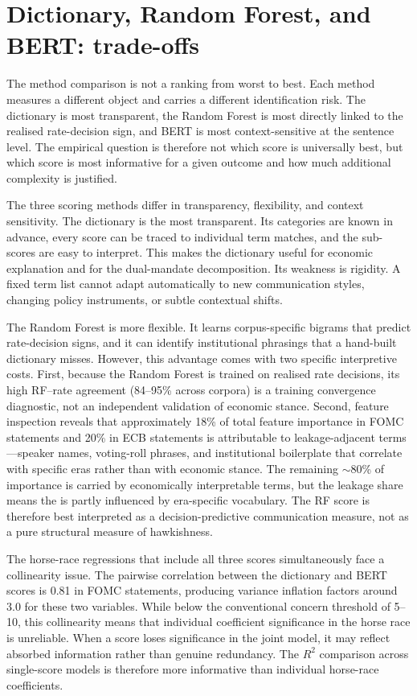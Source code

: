 \section{Dictionary, Random Forest, and BERT: trade-offs}
\label{sec:disc_method_tradeoffs}

The method comparison is not a ranking from worst to best. Each method measures
a different object and carries a different identification risk. The dictionary is
most transparent, the Random Forest is most directly linked to the realised
rate-decision sign, and BERT is most context-sensitive at the sentence
level. The empirical question is therefore not which score is universally best,
but which score is most informative for a given outcome and how much additional
complexity is justified.

The three scoring methods differ in transparency, flexibility, and context
sensitivity. The dictionary is the most transparent. Its categories are known in
advance, every score can be traced to individual term matches, and the
sub-scores are easy to interpret. This makes the dictionary useful for economic
explanation and for the dual-mandate decomposition. Its weakness is rigidity.
A fixed term list cannot adapt automatically to new communication styles,
changing policy instruments, or subtle contextual shifts.

The Random Forest is more flexible. It learns corpus-specific bigrams that
predict rate-decision signs, and it can identify institutional phrasings that a
hand-built dictionary misses. However, this advantage comes with two specific
interpretive costs. First, because the Random Forest is trained on realised rate
decisions, its high RF--rate agreement (84--95\% across corpora) is a training
convergence diagnostic, not an independent validation of economic stance.
Second, feature inspection reveals that approximately 18\% of total feature
importance in FOMC statements and 20\% in ECB statements is attributable to
leakage-adjacent terms---speaker names, voting-roll phrases, and institutional
boilerplate that correlate with specific eras rather than with economic stance.
The remaining $\sim$80\% of importance is carried by economically interpretable
terms, but the leakage share means the \rfscore{} is partly influenced by
era-specific vocabulary. The RF score is therefore best interpreted as a
decision-predictive communication measure, not as a pure structural measure of
hawkishness.

The horse-race regressions that include all three scores simultaneously face a
collinearity issue. The pairwise correlation between the dictionary and
BERT scores is 0.81 in FOMC statements, producing variance inflation
factors around 3.0 for these two variables. While below the conventional concern
threshold of 5--10, this collinearity means that individual coefficient
significance in the horse race is unreliable. When a score loses significance
in the joint model, it may reflect absorbed information rather than genuine
redundancy. The $R^2$ comparison across single-score models is therefore more
informative than individual horse-race coefficients.

